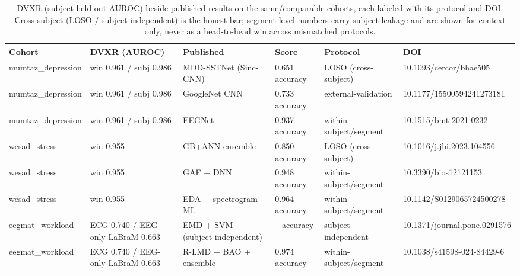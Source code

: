 \begin{table}[t]
\centering
\footnotesize
\caption{DVXR (subject-held-out AUROC) beside published results on the same/comparable cohorts, each labeled with its protocol and DOI. Cross-subject (LOSO / subject-independent) is the honest bar; segment-level numbers carry subject leakage and are shown for context only, never as a head-to-head win across mismatched protocols.}
\label{tab:sota}
\begin{tabular}{p{2.4cm}p{2.2cm}p{3.0cm}p{2.2cm}p{2.3cm}p{2.6cm}}
\toprule
Cohort & DVXR (AUROC) & Published & Score & Protocol & DOI \\
\midrule
mumtaz\_depression & win 0.961 / subj 0.986 & MDD-SSTNet (Sinc-CNN) & 0.651 accuracy & LOSO (cross-subject) & 10.1093/cercor/bhae505 \\
mumtaz\_depression & win 0.961 / subj 0.986 & GoogleNet CNN & 0.733 accuracy & external-validation & 10.1177/15500594241273181 \\
mumtaz\_depression & win 0.961 / subj 0.986 & EEGNet & 0.937 accuracy & within-subject/segment & 10.1515/bmt-2021-0232 \\
wesad\_stress & win 0.955 & GB+ANN ensemble & 0.850 accuracy & LOSO (cross-subject) & 10.1016/j.jbi.2023.104556 \\
wesad\_stress & win 0.955 & GAF + DNN & 0.948 accuracy & within-subject/segment & 10.3390/bios12121153 \\
wesad\_stress & win 0.955 & EDA + spectrogram ML & 0.964 accuracy & within-subject/segment & 10.1142/S0129065724500278 \\
eegmat\_workload & ECG 0.740 / EEG-only LaBraM 0.663 & EMD + SVM (subject-independent) & -- accuracy & subject-independent & 10.1371/journal.pone.0291576 \\
eegmat\_workload & ECG 0.740 / EEG-only LaBraM 0.663 & R-LMD + BAO + ensemble & 0.974 accuracy & within-subject/segment & 10.1038/s41598-024-84429-6 \\
\bottomrule
\end{tabular}
\end{table}
